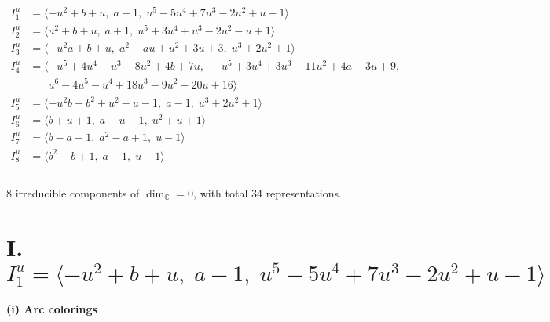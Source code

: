 \documentclass[1p]{elsarticle_modified}
\theoremstyle{definition}
\begin{document}
\begin{align*}
I^u_{1}&=\langle 
- u^2+b+u,\;a-1,\;u^5-5 u^4+7 u^3-2 u^2+u-1\rangle \\
I^u_{2}&=\langle 
u^2+b+u,\;a+1,\;u^5+3 u^4+u^3-2 u^2- u+1\rangle \\
I^u_{3}&=\langle 
- u^2 a+b+u,\;a^2- a u+u^2+3 u+3,\;u^3+2 u^2+1\rangle \\
I^u_{4}&=\langle 
- u^5+4 u^4- u^3-8 u^2+4 b+7 u,\;- u^5+3 u^4+3 u^3-11 u^2+4 a-3 u+9,\\
\phantom{I^u_{4}}&\phantom{= \langle  }u^6-4 u^5- u^4+18 u^3-9 u^2-20 u+16\rangle \\
I^u_{5}&=\langle 
- u^2 b+b^2+u^2- u-1,\;a-1,\;u^3+2 u^2+1\rangle \\
I^u_{6}&=\langle 
b+u+1,\;a- u-1,\;u^2+u+1\rangle \\
I^u_{7}&=\langle 
b- a+1,\;a^2- a+1,\;u-1\rangle \\
I^u_{8}&=\langle 
b^2+b+1,\;a+1,\;u-1\rangle \\
\\
\end{align*}
\raggedright * 8 irreducible components of $\dim_{\mathbb{C}}=0$, with total 34 representations.\\
\newpage
\renewcommand{\arraystretch}{1}
\centering \section*{I. $I^u_{1}= \langle - u^2+b+u,\;a-1,\;u^5-5 u^4+7 u^3-2 u^2+u-1 \rangle$}
\flushleft \textbf{(i) Arc colorings}\\
\end{document}
